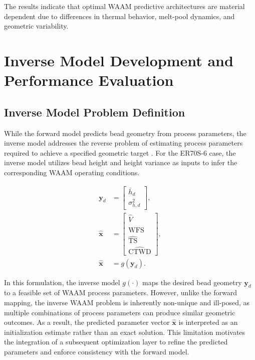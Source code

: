 \documentclass[11pt]{article}
\begin{document}
The results indicate that optimal WAAM predictive architectures are material dependent due to differences in thermal behavior, melt-pool dynamics, and geometric variability.

\section{Inverse Model Development and Performance Evaluation}

\subsection{Inverse Model Problem Definition}

While the forward model predicts bead geometry from process parameters, the inverse model addresses the reverse problem of estimating process parameters required to achieve a specified geometric target \cite{Mansor2024,Wang2026}. For the ER70S-6 case, the inverse model utilizes bead height and height variance as inputs to infer the corresponding WAAM operating conditions.

\begin{tcolorbox}[colback=white,colframe=black,boxrule=0.5pt,arc=2pt]
\begin{equation}
\begin{aligned}
\mathbf{y}_{d} &=
\begin{bmatrix}
\bar{h}_{d} \\
\sigma_{h,d}^{2}
\end{bmatrix}, \\
\hat{\mathbf{x}} &=
\begin{bmatrix}
\hat{V} \\
\widehat{\mathrm{WFS}} \\
\widehat{\mathrm{TS}} \\
\widehat{\mathrm{CTWD}}
\end{bmatrix}, \\
\hat{\mathbf{x}} &= g(\mathbf{y}_{d}).
\end{aligned}
\end{equation}
\end{tcolorbox}

In this formulation, the inverse model $g(\cdot)$ maps the desired bead geometry $\mathbf{y}_d$ to a feasible set of WAAM process parameters. However, unlike the forward mapping, the inverse WAAM problem is inherently non-unique and ill-posed, as multiple combinations of process parameters can produce similar geometric outcomes. As a result, the predicted parameter vector $\hat{\mathbf{x}}$ is interpreted as an initialization estimate rather than an exact solution. This limitation motivates the integration of a subsequent optimization layer to refine the predicted parameters and enforce consistency with the forward model.
\end{document}
